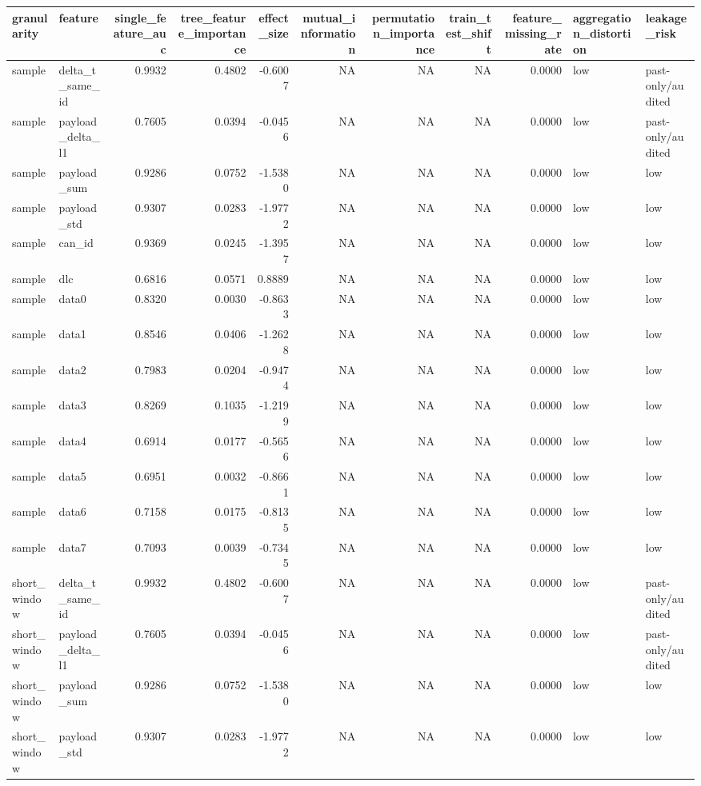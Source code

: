 \begin{tabular}{llrrrrrrrll}
\toprule
granularity & feature & single\_feature\_auc & tree\_feature\_importance & effect\_size & mutual\_information & permutation\_importance & train\_test\_shift & feature\_missing\_rate & aggregation\_distortion & leakage\_risk \\
\midrule
sample & delta\_t\_same\_id & 0.9932 & 0.4802 & -0.6007 & NA & NA & NA & 0.0000 & low & past-only/audited \\
sample & payload\_delta\_l1 & 0.7605 & 0.0394 & -0.0456 & NA & NA & NA & 0.0000 & low & past-only/audited \\
sample & payload\_sum & 0.9286 & 0.0752 & -1.5380 & NA & NA & NA & 0.0000 & low & low \\
sample & payload\_std & 0.9307 & 0.0283 & -1.9772 & NA & NA & NA & 0.0000 & low & low \\
sample & can\_id & 0.9369 & 0.0245 & -1.3957 & NA & NA & NA & 0.0000 & low & low \\
sample & dlc & 0.6816 & 0.0571 & 0.8889 & NA & NA & NA & 0.0000 & low & low \\
sample & data0 & 0.8320 & 0.0030 & -0.8633 & NA & NA & NA & 0.0000 & low & low \\
sample & data1 & 0.8546 & 0.0406 & -1.2628 & NA & NA & NA & 0.0000 & low & low \\
sample & data2 & 0.7983 & 0.0204 & -0.9474 & NA & NA & NA & 0.0000 & low & low \\
sample & data3 & 0.8269 & 0.1035 & -1.2199 & NA & NA & NA & 0.0000 & low & low \\
sample & data4 & 0.6914 & 0.0177 & -0.5656 & NA & NA & NA & 0.0000 & low & low \\
sample & data5 & 0.6951 & 0.0032 & -0.8661 & NA & NA & NA & 0.0000 & low & low \\
sample & data6 & 0.7158 & 0.0175 & -0.8135 & NA & NA & NA & 0.0000 & low & low \\
sample & data7 & 0.7093 & 0.0039 & -0.7345 & NA & NA & NA & 0.0000 & low & low \\
short\_window & delta\_t\_same\_id & 0.9932 & 0.4802 & -0.6007 & NA & NA & NA & 0.0000 & low & past-only/audited \\
short\_window & payload\_delta\_l1 & 0.7605 & 0.0394 & -0.0456 & NA & NA & NA & 0.0000 & low & past-only/audited \\
short\_window & payload\_sum & 0.9286 & 0.0752 & -1.5380 & NA & NA & NA & 0.0000 & low & low \\
short\_window & payload\_std & 0.9307 & 0.0283 & -1.9772 & NA & NA & NA & 0.0000 & low & low \\

\end{tabular}
